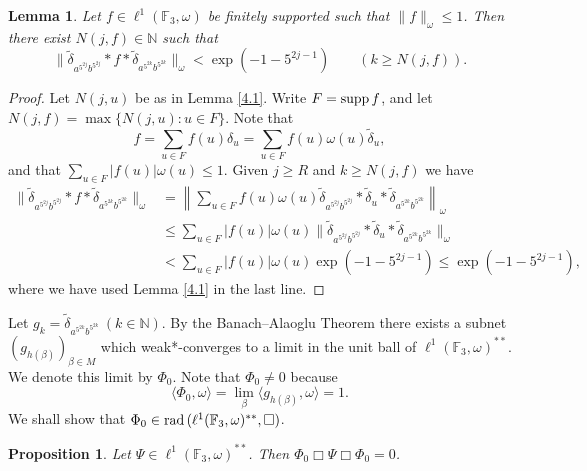 \documentclass[twoside,11pt]{amsart}
\numberwithin{equation}{section}
\newtheorem{lemma}[theorem]{Lemma}
\newtheorem{proposition}[theorem]{Proposition}
\theoremstyle{definition}
\newcommand {\N}{\mathbb N}
\newcommand{\rad}{{\rm rad\,}}
\newcommand{\supp}{{\rm supp\,}}
\newcommand{\1}{\mathbbm{1}}
\newcommand{\F}{\mathbb F}
\begin{document}
	\begin{lemma}		\label{4.3}
		Let $f \in \ell^1(\F_3, \omega)$ be finitely supported such that $\|f\|_\omega \leq 1$. Then there exist $N(j,f) \in \N$ such that 
		$$\| \widetilde{\delta}_{a^{5^{2j}} b^{5^{2j}}} * f * \widetilde{\delta}_{a^{5^{2k}} b^{5^{2k}}} \|_\omega < \exp(-1 -5^{2j-1}) \qquad (k \geq N(j,f)).$$
	\end{lemma}
	
	\begin{proof}
		Let  $N(j,u)$ be as in Lemma \ref{4.1}. Write $F = \supp f$, and let $N(j,f) = \max \{ N(j,u) : u \in F \}.$ Note that
		$$f = \sum_{u \in F} f(u) \delta_u = \sum_{u \in F} f(u) \omega(u) \widetilde{\delta}_u ,$$
		and that $\sum_{u \in F} |f(u)|\omega(u) \leq 1.$ Given $j \geq R$ and $k \geq N(j,f)$ we have
		\begin{align*}
			\| \widetilde{\delta}_{a^{5^{2j}} b^{5^{2j}}} * f * \widetilde{\delta}_{a^{5^{2k}} b^{5^{2k}}} \|_\omega 
			&= \left\| \sum_{u \in F} f(u) \omega(u) \widetilde{\delta}_{a^{5^{2j}}b^{5^{2j}}} * \widetilde{\delta}_u * \widetilde{\delta}_{a^{5^{2k}}b^{5^{2k}}} \right\|_\omega \\
			&\leq \sum_{u \in F} |f(u)|\omega(u) 
			\| \widetilde{\delta}_{a^{5^{2j}} b^{5^{2j}}} * \widetilde{\delta}_u * \widetilde{\delta}_{a^{5^{2k}} b^{5^{2k}}} \|_\omega \\
			&< \sum_{u \in F} |f(u)|\omega(u) \exp(-1 -5^{2j-1})  \leq \exp(-1 -5^{2j-1}) ,
		\end{align*}
		where we have used Lemma \ref{4.1} in the last line.
	\end{proof}
	
	Let $g_k = \widetilde{\delta}_{a^{5^{2k}}b^{5^{2k}}} \ (k \in \N).$ By the Banach--Alaoglu Theorem there exists a subnet
	$(g_{h(\beta)})_{\beta \in M}$ which weak*-converges to a limit in the unit ball of $\ell^1(\F_3, \omega)^{**}$. We denote this limit by $\Phi_0$. 
	Note that $\Phi_0 \neq 0$ because $$\langle \Phi_0, \omega \rangle = \lim_{\beta} \langle g_{h(\beta)}, \omega \rangle  = 1.$$
	We shall show that $\Phi_0 \in \rad( \ell^1(\F_3, \omega)^{**}, \Box)$.
	
	
	\begin{proposition}		\label{4.4}
		Let $\Psi \in \ell^1(\F_3, \omega)^{**}$. Then $\Phi_0 \Box \Psi \Box \Phi_0 = 0$.
	\end{proposition}
	
\end{document}
